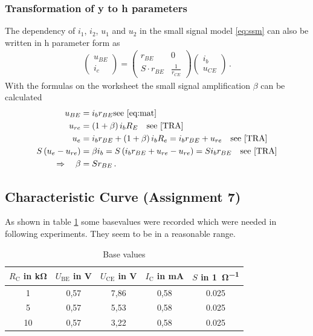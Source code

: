 \documentclass[11pt, a4paper]{article}
\begin{document}
\subsubsection{Transformation of y to h parameters}
The dependency of $i_1$, $i_2$, $u_1$ and $u_2$ in the small signal model \ref{eq:ssm} can also be written in h parameter form as
\begin{align}
    \begin{pmatrix}
        u_{BE} \\
        i_c
    \end{pmatrix}
    = 
    \begin{pmatrix}
        r_{BE} & 0 \\
        S \cdot r_{BE} & \frac{1}{r_{CE}}
    \end{pmatrix}
    \begin{pmatrix}
        i_b \\
        u_{CE}
    \end{pmatrix} \,.
    \label{eq:mat}
\end{align}
With the formulas on the worksheet the small signal amplification $\beta$ can be calculated
\begin{align}
    u_{BE} &= i_b r_{BE} \text{see \ref{eq:mat}}\\
    u_{re} &= \left( 1 + \beta \right) i_b R_E \quad  \text{see \cite[figure 8 and formula (24)]{TRA}}\\
    u_e &= i_b r_{BE} + \left( 1 + \beta \right) i_b R_e = i_b r_{BE} + u_{re} \quad \text{see \cite[formula (28)]{TRA}} \\
    S\left( u_e - u_{re} \right) &= \beta i_b = S \left( i_b r_{BE} + u_{re} - u_{re} \right) = S i_b r_{BE} \quad \text{see \cite[formula (27)]{TRA}} \\
    \Rightarrow \quad \beta &= S r_{BE} \,.
\end{align}




\FloatBarrier
\subsection{Characteristic Curve (Assignment 7)}
As shown in table \ref{tab:operating point_measurement} some basevalues were recorded which were needed in following experiments. They seem to be in a reasonable range.

\begin{table}[H]
    \centering
    \begin{tabular}{c|c|c|c|c}
    
        $R_{\text{C}}$ in \si{\kilo\ohm}  & $U_{\text{BE}}$ in \si{\volt} & $U_{\text{CE}}$ in \si{\volt} & $I_{\text{C}}$ in \si{\milli\ampere} & $S$ in \si{1\per\ohm} \\ \hline
        1 & 0,57 & 7,86 & 0,58 & 0.025\\ 
        5 & 0,57 & 5,53 & 0,58 & 0.025\\ 
        10 & 0,57 & 3,22 & 0,58 & 0.025\\ 
    \end{tabular}
    \label{tab:operating point_measurement}
    \caption{Base values}
\end{table}
\end{document}
